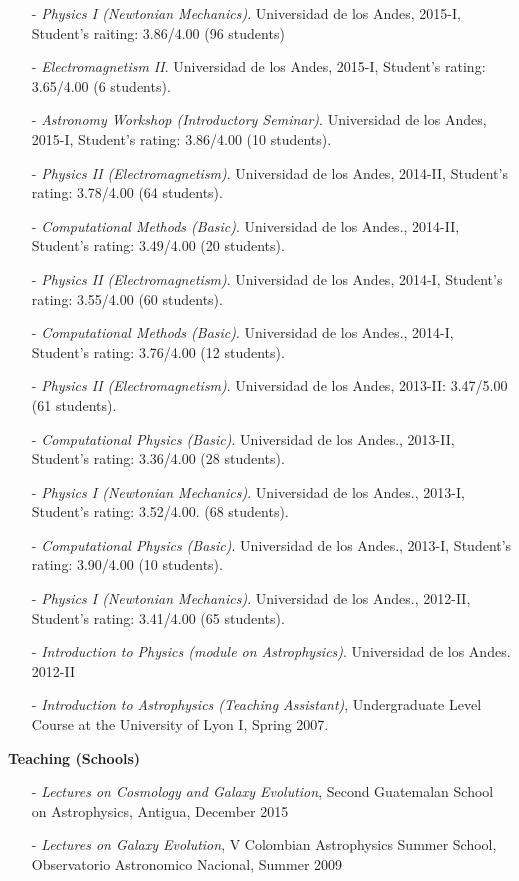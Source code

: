 \documentclass[letterpaper,11pt,onecolumn]{article}
\begin{document}
\begin{itemize}

\item[-] {\it Physics I (Newtonian Mechanics)}. Universidad de los
  Andes, 2015-I,  Student's raiting: 3.86/4.00 (96 students)
\item[-] {\it Electromagnetism II}. Universidad de los Andes, 2015-I,
  Student's rating: 3.65/4.00 (6 students).
\item[-] {\it Astronomy Workshop (Introductory Seminar)}. Universidad
  de los Andes, 2015-I, Student's rating: 3.86/4.00 (10 students).
\item[-] {\it Physics II (Electromagnetism)}. Universidad de
  los Andes, 2014-II, Student's rating: 3.78/4.00 (64 students).  
\item[-] {\it Computational Methods (Basic)}. Universidad de los
  Andes., 2014-II, Student's rating: 3.49/4.00 (20 students).
\item[-] {\it Physics II (Electromagnetism)}. Universidad de
  los Andes, 2014-I, Student's rating: 3.55/4.00 (60 students).  
\item[-] {\it Computational Methods (Basic)}. Universidad de los
  Andes., 2014-I, Student's rating: 3.76/4.00 (12 students).
\item[-] {\it Physics II (Electromagnetism)}. Universidad de
  los Andes, 2013-II: 3.47/5.00 (61 students).
\item[-] {\it Computational Physics (Basic)}. Universidad de los
  Andes., 2013-II, Student's rating: 3.36/4.00 (28 students).
\item[-] {\it Physics I (Newtonian Mechanics)}. Universidad
  de los Andes., 2013-I, Student's rating: 3.52/4.00. (68 students).
\item[-] {\it Computational Physics (Basic)}. Universidad de los
  Andes., 2013-I, Student's rating: 3.90/4.00 (10 students).
\item[-] {\it Physics I (Newtonian Mechanics)}. Universidad
  de los Andes., 2012-II, Student's rating: 3.41/4.00 (65 students).
\item[-] {\it Introduction to Physics (module on
  Astrophysics)}. Universidad de los Andes.  2012-II
\item[-]{\it{Introduction to Astrophysics (Teaching
      Assistant)}}, Undergraduate Level Course at the University of Lyon I,
      Spring 2007.
\end{itemize}

{\bf Teaching (Schools)}
\begin{itemize}
\item[-]{\it Lectures on Cosmology and Galaxy Evolution}, Second Guatemalan School on Astrophysics, Antigua, December 2015
\item[-]{\it Lectures on Galaxy Evolution}, V Colombian
  Astrophysics Summer School, Observatorio Astronomico Nacional, Summer 2009
\end{itemize}
\end{document}
